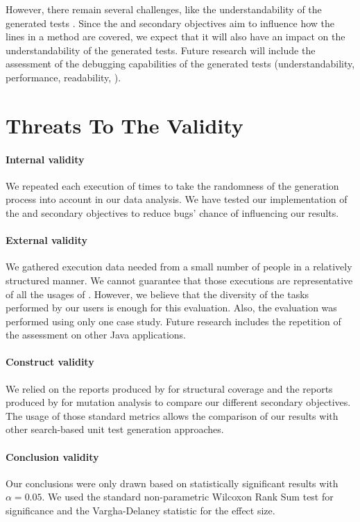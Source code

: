 However, there remain several challenges, like the understandability of the generated tests \cite{FA13challenges, almasi2017industrial}. Since the \com and \ucom secondary objectives aim to influence how the lines in a method are covered, we expect that it will also have an impact on the understandability of the generated tests. Future research will include the assessment of the debugging capabilities of the generated tests (\eg understandability, performance, readability, \etc).


\section{Threats To The Validity}

\paragraph{Internal validity}

We repeated each execution of  times to take the randomness of the generation process into account in our data analysis. 
We have tested our implementation of the \com and \ucom secondary objectives to reduce bugs' chance of influencing our results. 

\paragraph{External validity}

We gathered execution data needed from a small number of people in a relatively structured manner. We cannot guarantee that those executions are representative of all the usages of \jabref. However, we believe that the diversity of the tasks performed by our users is enough for this evaluation. 
Also, the evaluation was performed using only one case study. Future research includes the repetition of the assessment on other Java applications. 

\paragraph{Construct validity}

We relied on the reports produced by \evosuite for structural coverage and the reports produced by \pit for mutation analysis to compare our different secondary objectives. The usage of those standard metrics allows the comparison of our results with other search-based unit test generation approaches. 

\paragraph{Conclusion validity}

Our conclusions were only drawn based on statistically significant results with $\alpha=0.05$. We used the standard non-parametric Wilcoxon Rank Sum test for significance and the Vargha-Delaney statistic for the effect size. 
